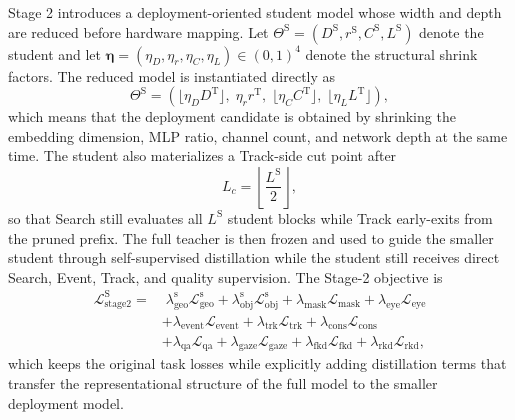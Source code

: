 \documentclass[journal]{IEEEtran}
\begin{document}
Stage 2 introduces a deployment-oriented student model whose width and depth are reduced before hardware mapping. Let $\Theta^{\mathrm{S}}=(D^{\mathrm{S}}, r^{\mathrm{S}}, C^{\mathrm{S}}, L^{\mathrm{S}})$ denote the student and let $\bm\eta=(\eta_D,\eta_r,\eta_C,\eta_L)\in(0,1)^4$ denote the structural shrink factors. The reduced model is instantiated directly as
\begin{equation}
\Theta^{\mathrm{S}}=
(\lfloor \eta_D D^{\mathrm{T}}\rfloor,\;
\eta_r r^{\mathrm{T}},\;
\lfloor \eta_C C^{\mathrm{T}}\rfloor,\;
\lfloor \eta_L L^{\mathrm{T}}\rfloor),
\end{equation}
which means that the deployment candidate is obtained by shrinking the embedding dimension, MLP ratio, channel count, and network depth at the same time. The student also materializes a Track-side cut point after
\begin{equation}
L_c = \left\lfloor \frac{L^{\mathrm S}}{2} \right\rfloor,
\end{equation}
so that Search still evaluates all $L^{\mathrm S}$ student blocks while Track early-exits from the pruned prefix. The full teacher is then frozen and used to guide the smaller student through self-supervised distillation while the student still receives direct Search, Event, Track, and quality supervision. The Stage-2 objective is
\begin{align}
\mathcal L_{\mathrm{stage2}}^{\mathrm{S}} =
&\;\lambda_{\mathrm{geo}}^{\mathrm{s}}\mathcal L_{\mathrm{geo}}^{\mathrm{s}}
+ \lambda_{\mathrm{obj}}^{\mathrm{s}}\mathcal L_{\mathrm{obj}}^{\mathrm{s}}
+ \lambda_{\mathrm{mask}}\mathcal L_{\mathrm{mask}}
+ \lambda_{\mathrm{eye}}\mathcal L_{\mathrm{eye}}
\nonumber\\
&+ \lambda_{\mathrm{event}}\mathcal L_{\mathrm{event}}
+ \lambda_{\mathrm{trk}}\mathcal L_{\mathrm{trk}}
+ \lambda_{\mathrm{cons}}\mathcal L_{\mathrm{cons}}
\nonumber\\
&+ \lambda_{\mathrm{qa}}\mathcal L_{\mathrm{qa}}
+ \lambda_{\mathrm{gaze}}\mathcal L_{\mathrm{gaze}}
+ \lambda_{\mathrm{fkd}}\mathcal L_{\mathrm{fkd}}
+ \lambda_{\mathrm{rkd}}\mathcal L_{\mathrm{rkd}},
\end{align}
which keeps the original task losses while explicitly adding distillation terms that transfer the representational structure of the full model to the smaller deployment model.
\end{document}
